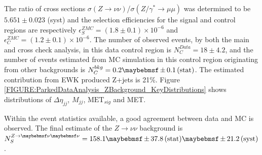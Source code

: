 The ratio of cross sections $\sigma(Z\rightarrow\nu\nu)$/$\sigma(Z/\gamma^{*}\rightarrow\mu\mu)$ was determined to be $5.651\pm 0.023$ (syst) and the selection efficiencies for the signal and control regions are respectively $\epsilon_{S}^{ZMC}=(1.8\pm 0.1) \times 10^{-6}$ and $\epsilon_{C}^{ZMC}=(1.2\pm 0.1) \times 10^{-6}$. The number of observed events, by both the main and cross check analysis, in this data control region is $N_{C}^{Data}=18\pm 4.2$, and the number of events estimated from \gls{MC} simulation in this control region originating from other backgrounds is $N_{C}^{bkg}=0.2 \pm 0.1 \stat$. The estimated contribution from \gls{EWK} produced Z+jets is 21\%. Figure \ref{FIGURE:ParkedDataAnalysis_ZBackground_KeyDistributions} shows distributions of $\Delta\eta_{jj}$, $M_{jj}$, $\text{MET}_{sig}$ and \gls{MET}.

Within the event statistics available, a good agreement between data and MC is observed. The final estimate of the $Z\rightarrow \nu\nu$ background is $N_{S}^{Z\rightarrow\nu\nu}= 158.1 \pm 37.8 \stat \pm 21.2 \syst$.
% 

